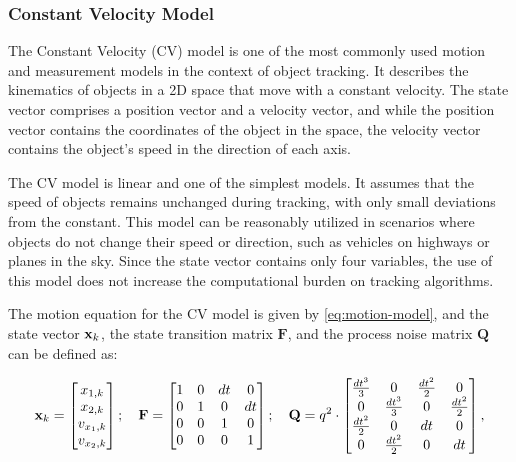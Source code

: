 \subsubsection{Constant Velocity Model}

The Constant Velocity (CV) model is one of the most commonly used motion and measurement models in the context of object tracking. It describes the kinematics of objects in a 2D space that move with a constant velocity. The state vector comprises a position vector and a velocity vector, and while the position vector contains the coordinates of the object in the space, the velocity vector contains the object's speed in the direction of each axis.

The CV model is linear and one of the simplest models. It assumes that the speed of objects remains unchanged during tracking, with only small deviations from the constant. This model can be reasonably utilized in scenarios where objects do not change their speed or direction, such as vehicles on highways or planes in the sky. Since the state vector contains only four variables, the use of this model does not increase the computational burden on tracking algorithms.

The motion equation for the CV model is given by \ref{eq:motion-model}, and the state vector $\vecat{x}{k}$, the state transition matrix $\mathbf{F}$, and the process noise matrix $\mathbf{Q}$ can be defined as:

\begin{equation}
    \vecat{x}{k} =
    \begin{bmatrix}
        x_{1,k} \\ 
        x_{2,k} \\ 
        v_{x_1,k} \\ 
        v_{x_2,k}
    \end{bmatrix};
    \quad
    \mathbf{F} =
    \begin{bmatrix}
       1 & 0 & dt & 0 \\
       0 & 1 & 0 & dt \\
       0 & 0 & 1 &  0 \\
       0 & 0 & 0 &  1 
    \end{bmatrix};
    \quad
    \mathbf{Q} = q^2 \cdot
    \begin{bmatrix}
        \frac{dt^3}{3}    & 0                 & \frac{dt^{2}}{2}  & 0  \\
        0                 & \frac{dt^3}{3}    & 0                 & \frac{dt^{2}}{2} \\
        \frac{dt^{2}}{2}  & 0                 & dt                & 0 \\
        0                 & \frac{dt^{2}}{2}  & 0                 & dt
    \end{bmatrix},
\end{equation}

